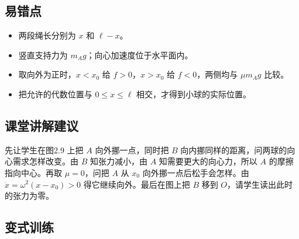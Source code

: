 \documentclass[UTF8,fontset=fandol,a4paper,11pt]{ctexart}
\begin{document}


\subsection*{易错点}

\begin{itemize}
\item 两段绳长分别为 $x$ 和 $\ell-x$。
\item 竖直支持力为 $m_Ag$；向心加速度位于水平面内。
\item 取向外为正时，$x<x_0$ 给 $f>0$，$x>x_0$ 给 $f<0$，两侧均与 $\mu m_Ag$ 比较。
\item 把允许的代数位置与 $0\leq x\leq\ell$ 相交，才得到小球的实际位置。
\end{itemize}



\subsection*{课堂讲解建议}

先让学生在图2.9 上把 $A$ 向外挪一点，同时把 $B$ 向内挪同样的距离，问两球的向心需求怎样改变。由 $B$ 知张力减小，由 $A$ 知需要更大的向心力，所以 $A$ 的摩擦指向中心。再取 $\mu=0$，问把 $A$ 从 $x_0$ 向外挪一点后松手会怎样。由 $\ddot x=\omega^2(x-x_0)>0$ 得它继续向外。最后在图上把 $B$ 移到 $O$，请学生读出此时的张力为零。



\subsection*{变式训练}
\end{document}
